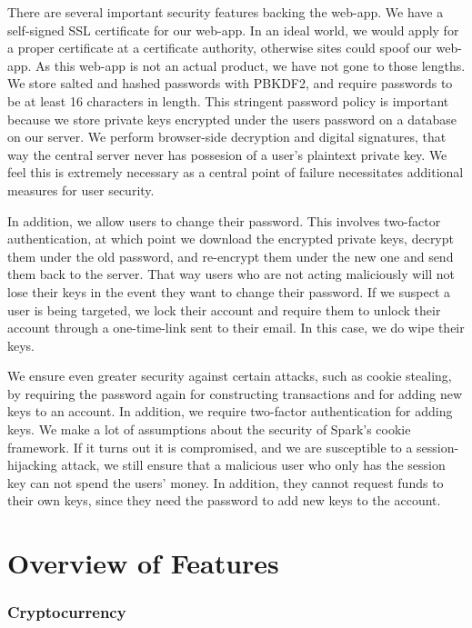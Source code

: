 \documentclass[12pt]{article}
\begin{document}
There are several important security features backing the web-app. We have a self-signed SSL certificate for our web-app. In an ideal world, we would apply for a proper certificate at a certificate authority, otherwise sites could spoof our web-app. As this web-app is not an actual product, we have not gone to those lengths. We store salted and hashed passwords with PBKDF2, and require passwords to be at least 16 characters in length. This stringent password policy is important because we store private keys encrypted under the users password on a database on our server. We perform browser-side decryption and digital signatures, that way the central server never has possesion of a user's plaintext private key. We feel this is extremely necessary as a central point of failure necessitates additional measures for user security.

In addition, we allow users to change their password. This involves two-factor authentication, at which point we download the encrypted private keys, decrypt them under the old password, and re-encrypt them under the new one and send them back to the server. That way users who are not acting maliciously will not lose their keys in the event they want to change their password. If we suspect a user is being targeted, we lock their account and require them to unlock their account through a one-time-link sent to their email. In this case, we do wipe their keys.

We ensure even greater security against certain attacks, such as cookie stealing, by requiring the password again for constructing transactions and for adding new keys to an account. In addition, we require two-factor authentication for adding keys. We make a lot of assumptions about the security of Spark's cookie framework. If it turns out it is compromised, and we are susceptible to a session-hijacking attack, we still ensure that a malicious user who only has the session key can not spend the users' money. In addition, they cannot request funds to their own keys, since they need the password to add new keys to the account.

\section{Overview of Features}

\subsubsection*{Cryptocurrency}
\end{document}
